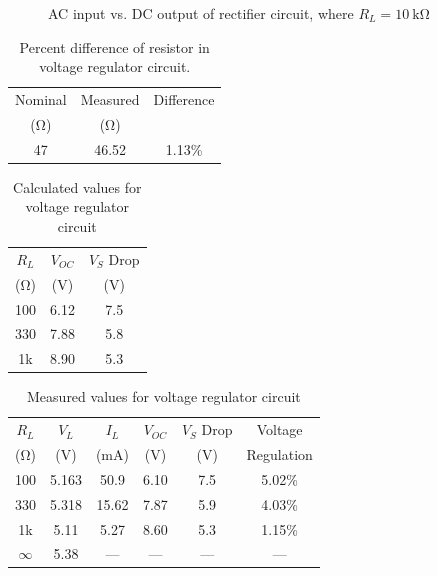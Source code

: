 \documentclass{article}
\begin{document}
\begin{figure}[hbtp]
  \centering
  
  \caption{\label{fig:rect_vp_vdc} AC input vs. DC output of rectifier circuit, where $R_L=\SI{10}{\kilo\ohm}$}
\end{figure}

\begin{table}[hbtp]
  \centering
  \begin{tabular}{ccc}
    Nominal     & Measured    & Difference \\
    (\si{\ohm}) & (\si{\ohm}) &            \\
    \hline
    47          & 46.52       & 1.13\%     \\
  \end{tabular}
  \caption{\label{tab:res} Percent difference of resistor in voltage regulator circuit.}
\end{table}

\begin{table}
  \centering
  \begin{tabular}{ccc}
    $R_L$       & $V_{OC}$ & $V_S$ Drop \\
    (\si{\ohm}) & (\si{V}) & (\si{V})   \\
    \hline
    100         & 6.12     & 7.5        \\
    330         & 7.88     & 5.8        \\
    1k          & 8.90     & 5.3        \\
  \end{tabular}
  \caption{\label{tab:volt_reg_calc} Calculated values for voltage regulator circuit}
\end{table}

\begin{table}
  \centering
  \begin{tabular}{cccccc}
    $R_L$       & $V_L$    & $I_L$     & $V_{OC}$ & $V_S$ Drop & Voltage    \\
    (\si{\ohm}) & (\si{V}) & (\si{mA}) & (\si{V}) & (\si{V})   & Regulation \\
    \hline
    100         & 5.163    & 50.9      & 6.10     & 7.5        & 5.02\%     \\
    330         & 5.318    & 15.62     & 7.87     & 5.9        & 4.03\%     \\
    1k          & 5.11     & 5.27      & 8.60     & 5.3        & 1.15\%     \\
    $\infty$    & 5.38     & ---       & ---      & ---        & ---        \\
  \end{tabular}
  \caption{\label{tab:volt_reg_meas} Measured values for voltage regulator circuit}
\end{table}
\end{document}
